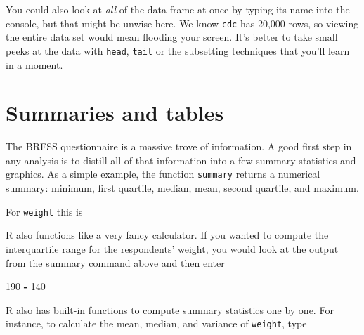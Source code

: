 \documentclass[]{book}
\newenvironment{Shaded}{\begin{snugshade}}{\end{snugshade}}
\newcommand{\DecValTok}[1]{\textcolor[rgb]{0.00,0.00,0.81}{#1}}
\newcommand{\KeywordTok}[1]{\textcolor[rgb]{0.13,0.29,0.53}{\textbf{#1}}}
\newcommand{\NormalTok}[1]{#1}
\newcommand{\OperatorTok}[1]{\textcolor[rgb]{0.81,0.36,0.00}{\textbf{#1}}}
\newcommand{\StringTok}[1]{\textcolor[rgb]{0.31,0.60,0.02}{#1}}
\theoremstyle{definition}
\theoremstyle{definition}
\theoremstyle{definition}
\theoremstyle{remark}
\begin{document}
You could also look at \emph{all} of the data frame at once by typing
its name into the console, but that might be unwise here. We know
\texttt{cdc} has 20,000 rows, so viewing the entire data set would mean
flooding your screen. It's better to take small peeks at the data with
\texttt{head}, \texttt{tail} or the subsetting techniques that you'll
learn in a moment.

\hypertarget{summaries-and-tables}{%
\section{Summaries and tables}\label{summaries-and-tables}}

The BRFSS questionnaire is a massive trove of information. A good first
step in any analysis is to distill all of that information into a few
summary statistics and graphics. As a simple example, the function
\texttt{summary} returns a numerical summary: minimum, first quartile,
median, mean, second quartile, and maximum.

For \texttt{weight} this is

\begin{Shaded}
\end{Shaded}

R also functions like a very fancy calculator. If you wanted to compute
the interquartile range for the respondents' weight, you would look at
the output from the summary command above and then enter

\begin{Shaded}
\begin{Highlighting}[]
\DecValTok{190} \OperatorTok{-}\StringTok{ }\DecValTok{140}
\end{Highlighting}
\end{Shaded}

R also has built-in functions to compute summary statistics one by one.
For instance, to calculate the mean, median, and variance of
\texttt{weight}, type

\begin{Shaded}
\end{Shaded}
\end{document}
